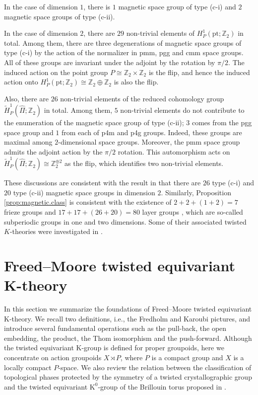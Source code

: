 \documentclass[11pt]{amsart}
\theoremstyle{definition}
\theoremstyle{plain}
\theoremstyle{remark}
\newcommand{\bZ}{\mathbb{Z}}
\newcommand{\K}{\mathrm{K}}%
\newcommand{\pt}{\mathrm{pt}}
\begin{document}
In the case of dimension $1$, there is $1$ magnetic space group of type (c-i) and $2$ magnetic space groups of type (c-ii).  

In the case of dimension $2$, there are $29$ non-trivial elements of $H^1_P(\pt ; \bZ_2)$ in total. 
Among them, there are three degenerations of magnetic space groups of type (c-i) by the action of the normalizer in \textsf{pmm}, \textsf{pgg} and \textsf{cmm} space groups. All of these groups are invariant under the adjoint by the rotation by $\pi/2$. The induced action on the point group $P \cong \bZ_2 \times \bZ_2$ is the flip, and hence the induced action onto $H_P^1(\pt;\bZ_2) \cong \bZ_2 \oplus \bZ_2$ is also the flip. 

Also, there are $26$ non-trivial elements of the reduced cohomology group $\tilde{H}^1_P(\hat{\Pi}; \bZ_2)$ in total. Among them, $5$ non-trivial elements do not contribute to the enumeration of the magnetic space group of type (c-ii); $3$ comes from the \textsf{pgg} space group and $1$ from each of \textsf{p4m} and \textsf{p4g} groups. Indeed, these groups are maximal among $2$-dimensional space groups. Moreover, the \textsf{pmm} space group admits the adjoint action by the $\pi/2$ rotation. This automorphism acts on $\tilde{H}^1_P(\hat{\Pi};\bZ_2) \cong \bZ_2^{\oplus 2}$ as the flip, which identifies two non-trivial elements. 

These discussions are consistent with the result in \cite{schwarzenbergerColourSymmetry1984} that there are $26$ type (c-i) and $20$ type (c-ii) magnetic space groups in dimension $2$. Similarly, Proposition \ref{prop:magnetic.class} is consistent with the existence of $2+2+(1+2)=7$ frieze groups and $17+17+(26+20)=80$ layer groups \cite{kopsky2002international}, which are so-called subperiodic groups in one and two dimensions. Some of their associated twisted $K$-theories were investigated in \cite{gomiCrystallographicTduality2019}.







\section{Freed--Moore twisted equivariant K-theory}\label{section:3}
In this section we summarize the foundations of Freed--Moore twisted equivariant K-theory.
We recall two definitions, i.e., the Fredholm and Karoubi pictures, and introduce several fundamental operations such as the pull-back, the open embedding, the product, the Thom isomorphism and the push-forward. Although the twisted equivariant K-group is defined for proper groupoids, here we concentrate on action groupoids $X \rtimes P$, where $P$ is a compact group and $X$ is a locally compact $P$-space.
We also review the relation between the classification of topological phases protected by the symmetry of a  twisted crystallographic group and the twisted equivariant $\K^0$-group of the Brillouin torus proposed in \cite{freedTwistedEquivariantMatter2013}.
\end{document}
